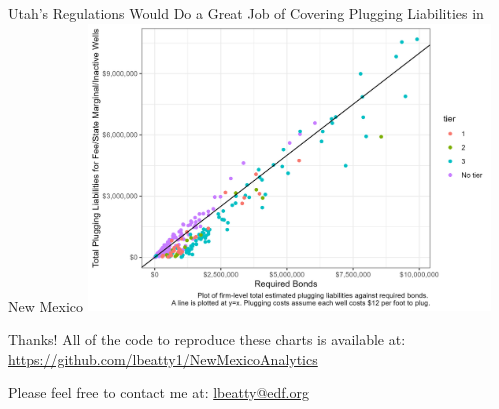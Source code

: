 \documentclass{beamer}
\begin{document}
\begin{frame}{Utah's Regulations Would Do a Great Job of Covering Plugging Liabilities in New Mexico}
\vspace{-0.5cm}
    \includegraphics[width=0.8\textwidth]{Figures/UtahReg/BondLiability_MarginalInactiveFeeState.jpg}
\end{frame}

\begin{frame}{Thanks!}
\label{Thanks}
    All of the code to reproduce these charts is available at: \href{https://github.com/lbeatty1/NewMexicoAnalytics}{https://github.com/lbeatty1/NewMexicoAnalytics}\\
    \vspace{1cm}


    Please feel free to contact me at:
    \href{mailto:lbeatty@edf.org}{lbeatty@edf.org}\\
    \vspace{1cm}

\end{frame}
\end{document}
